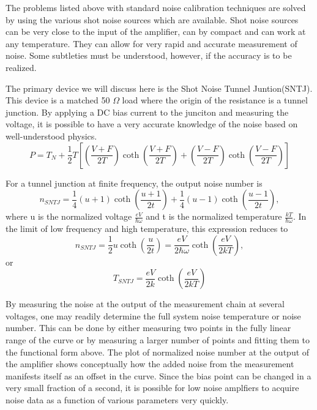 \documentclass[11pt]{article}
\begin{document}
	The problems listed above with standard noise calibration techniques are solved by using the various shot noise sources which are available.  Shot noise sources can be very close to the input of the amplifier, can by compact and can work at any temperature.  They can allow for very rapid and accurate measurement of noise.  Some subtleties must be understood, however, if the accuracy is to be realized.  




	The primary device we will discuss here is the Shot Noise Tunnel Juntion(SNTJ).  This device is a matched 50 $\Omega$ load where the origin of the resistance is a tunnel junction.  By applying a DC bias current to the junciton and measuring the voltage, it is possible to have a very accurate knowledge of the noise based on well-understood physics.  
$$P = T_N + \frac{1}{2}T\left[   \left(\frac{V+F}{2T}\right) \coth{\left(\frac{V+F}{2T}\right)} + \left(\frac{V-F}{2T}\right) \coth{\left(\frac{V-F}{2T}\right)}    \right]$$





     	For a tunnel junction at finite frequency, the output noise number is 
$$n_{SNTJ} = \frac{1}{4}\left( u + 1\right)\coth{\left(\frac{u+1}{2t}\right)} + \frac{1}{4}\left( u - 1 \right)\coth{\left(\frac{u-1}{2t}\right)} ,
$$where u is the normalized voltage $\frac{eV}{\hbar\omega}$ and t is the normalized temperature $\frac{kT}{\hbar\omega}$. In the limit of low frequency and high temperature, this expression reduces to 
$$n_{SNTJ} = \frac{1}{2}u\coth{\left(\frac{u}{2t}\right)} = \frac{eV}{2\hbar\omega}\coth{\left(\frac{eV}{2kT}\right)}, 
$$
or
$$
T_{SNTJ} = \frac{eV}{2k}\coth{\left(\frac{eV}{2kT}\right)}
$$


By measuring the noise at the output of the measurement chain at several voltages, one may readily determine the full system noise temperature or noise number.  This can be done by either measuring two points in the fully linear range of the curve or by measuring a larger number of points and fitting them to the functional form above.  The plot of normalized noise number at the output of the amplifier shows conceptually how the added noise from the measurement manifests itself as an offset in the curve.  Since the bias point can be changed in a very small fraction of a second, it is possible for low noise amplfiers to acquire noise data as a function of various parameters very quickly.  
\end{document}
